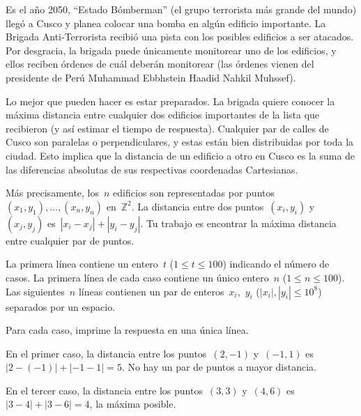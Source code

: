 
Es el año 2050, ``Estado Bómberman'' (el grupo terrorista más grande del mundo) llegó
a Cusco y planea colocar una bomba en algún edificio importante. La Brigada
Anti-Terrorista recibió una pista con los posibles edificios a ser atacados. Por
desgracia, la brigada puede únicamente monitorear uno de los edificios, y ellos
reciben órdenes de cuál deberán monitorear (las órdenes vienen del presidente de Perú
Muhammad Ebbhstein Haadid Nahkil Muhssef).

Lo mejor que pueden hacer es estar preparados. La brigada quiere conocer la máxima
distancia entre cualquier dos edificios importantes de la lista que recibieron (y así
estimar el tiempo de respuesta). Cualquier par de calles de Cusco son paralelas o
perpendiculares, y estas están bien distribuidas por toda la ciudad. Esto implica que
la distancia de un edificio a otro en Cusco es la suma de las diferencias absolutas
de sus respectivas coordenadas Cartesianas.

Más precisamente, los~$n$ edificios son representadas por
puntos~$(x_1, y_1), \dots, (x_n, y_n)$ en~$\mathbb{Z}^2$. La distancia entre dos
puntos~$(x_i, y_i)$ y~$(x_j, y_j)$ es~$|x_i - x_j| + |y_i - y_j|$. Tu trabajo es
encontrar la máxima distancia entre cualquier par de puntos.



La primera línea contiene un entero~$t$ ($1 \leq t \leq 100$) indicando el número de
casos. La primera línea de cada caso contiene un único entero~$n$
($1 \leq n \leq 100$). Las siguientes~$n$ líneas contienen un par de
enteros~$x_i$,~$y_i$ ($|x_i|, |y_i| \leq 10^8$) separados por un espacio.

\outputText

Para cada caso, imprime la respuesta en una única línea.

\exampleCases

\begin{example}
\end{example}

\explanationText

En el primer caso, la distancia entre los puntos~$(2, -1)$ y~$(-1, 1)$
es~$|2 - (- 1)| + |-1 - 1| = 5$. No hay un par de puntos a mayor distancia.

En el tercer caso, la distancia entre los puntos~$(3, 3)$ y~$(4, 6)$
es~$|3 - 4| + |3 - 6| = 4$, la máxima posible.
